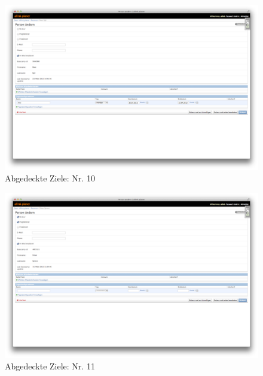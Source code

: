 \begin{figure}[htbp]
    \centering
        \includegraphics[height=0.85\textwidth,angle=90]{bilder/testing/Sperrtag_bearbeiten.png}
    \caption{Abgedeckte Ziele: Nr. 10}
    \label{fig:bilder_testing_Sperrtag_bearbeiten}
\end{figure}
\begin{figure}[htbp]
    \centering
        \includegraphics[height=0.85\textwidth,angle=90]{bilder/testing/Sperrtag_loeschen.png}
    \caption{Abgedeckte Ziele: Nr. 11}
    \label{fig:bilder_testing_Sperrtag_loeschen}
\end{figure}
